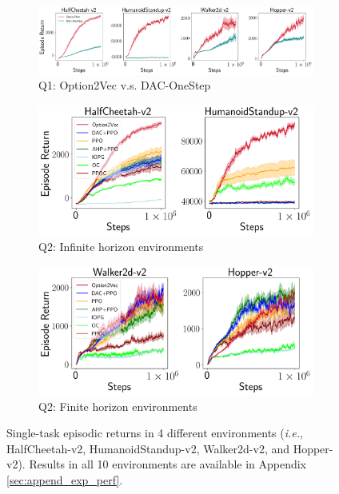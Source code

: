 \documentclass[10pt,journal,compsoc]{IEEEtran}
\begin{document}
\begin{figure}[thb]
  \begin{subfigure}{1\textwidth}
    \centering
    \includegraphics[width=1\linewidth]{figures/ET4.png}
    \caption{\label{fig:ET4}\small Q1: Option2Vec
      v.s. DAC-OneStep}
  \end{subfigure}
  \newline
  \begin{subfigure}{.5\textwidth}
    \centering
    \includegraphics[width=1\linewidth]{figures/Inf2.png}
    \caption{\small Q2: Infinite horizon environments}
    \label{fig:exp_inf}
  \end{subfigure}
  \begin{subfigure}{.5\textwidth}
    \centering
    \includegraphics[width=1\linewidth]{figures/F2.png}
    \caption{\small Q2: Finite horizon environments}
    \label{fig:exp_finite}
  \end{subfigure}
  \caption{\small Single-task episodic returns in 4 different environments (\textit{i.e.}, HalfCheetah-v2, HumanoidStandup-v2, Walker2d-v2, and Hopper-v2). Results in all 10 environments are available in Appendix \ref{sec:append_exp_perf}.}
  \label{fig:exp_dac} 
\end{figure}
\end{document}
